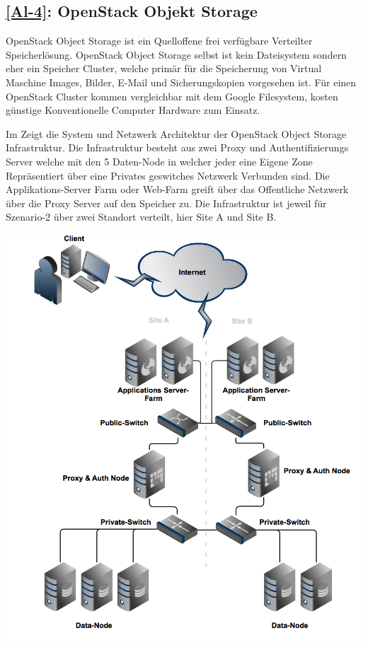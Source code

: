 \subsection{\ref{Al-4}: OpenStack Objekt Storage}
OpenStack Object Storage ist ein Quelloffene frei verfügbare Verteilter Speicherlösung. OpenStack Object Storage selbst ist kein Dateisystem sondern eher ein Speicher Cluster, welche primär für die Speicherung von Virtual Maschine Images, Bilder, E-Mail und Sicherungskopien vorgesehen ist. Für einen OpenStack Cluster kommen vergleichbar mit dem Google Filesystem, kosten günstige Konventionelle Computer Hardware zum Einsatz. 

Im  Zeigt die System und Netzwerk Architektur der OpenStack Object Storage Infrastruktur. Die Infrastruktur besteht aus zwei Proxy und Authentifizierungs Server welche mit den 5 Daten-Node in welcher jeder eine Eigene Zone Repräsentiert über eine Privates geswitches Netzwerk Verbunden sind. Die Applikations-Server Farm oder Web-Farm greift über das Offentliche Netzwerk über die Proxy Server auf den Speicher zu. Die Infrastruktur ist jeweil für Szenario-2 über zwei Standort verteilt, hier Site A und Site B.

\begin{center}
\includegraphics[width=\linewidth, keepaspectratio = true]{media/OpenStack.png}
\end{center}


